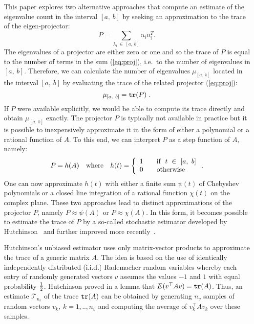 \documentclass[12pt]{article}		\usepackage{tabls,multirow}
\def\TT{\mathcal{T}}
\def\trace{\mbox{\tt tr}}
\newcommand{\ab}{[a, \ b]}
\def\nref#1{(\ref{#1})}
\newcommand{\eq}[1]{\begin{equation}\label{#1}}
\newcommand{\en}{\end{equation}}
\begin{document}
This paper explores two alternative approaches that compute an
estimate of the eigenvalue count in the interval $\ab$ by seeking an
approximation to the trace of the eigen-projector: \eq{eq:proj} P =
\sum_{\lambda_i \ \in \ \ab} u_i u_i^T .  \en The eigenvalues of a
projector are either zero or one and so the trace of $P$ is equal to
the number of terms in the sum \nref{eq:proj}, i.e.~to the number of
eigenvalues in $\ab$.  Therefore, we can calculate the number of
eigenvalues $\mu_{\ab}$ located in the interval $\ab$ by evaluating
the trace of the related projector \nref{eq:proj}:
\[
\mu_{\ab} = \trace (P ) \ .
\]
If $P$ were available explicitly, we would be able to compute its
trace directly and obtain $\mu_{\ab}$ exactly.  The projector $P$ is
typically not available in practice but it is possible to
inexpensively approximate it in the form of either a polynomial or a
rational function of $A$. To this end, we can interpret $P$ as a step
function of $A$, namely:
\begin{eqnarray}
\label{eq:hoft} 
P = h(A) \quad \mbox{where} \quad h(t) = \left\{\begin{array}{l l}
1  & \quad \textrm{if}\ \ t \ \in \ \ab\\
0  & \quad \textrm{otherwise}\\
\end{array}\right. .
\end{eqnarray}
One can now approximate $h(t)$ with either a finite sum $\psi(t)$ of
Chebyshev polynomials or a closed line integration of a rational
function $\chi(t)$ on the complex plane. These two approaches lead to
distinct approximations of the projector $P$, namely $P \approx
\psi(A)$ or $P \approx \chi(A)$.  In this form, it becomes possible to
estimate the trace of $P$ by a so-called stochastic estimator 
developed by Hutchinson~\cite{Hutchinson-est} and further improved
more recently~\cite{JTangYS, Iitaka:705693, Wong:2004tm}.

Hutchinson's unbiased estimator uses only matrix-vector products to
approximate the trace of a generic matrix $A$.  The idea is based on
the use of identically independently distributed (i.i.d.) Rademacher
random variables whereby each entry of randomly generated vectors $v$
assumes the values $-1$ and $1$ with equal probability ${1 \over 2}$.
Hutchinson proved in a lemma that $E(v^\top A v) = \trace (A)$.  Thus,
an estimate $\TT_{n_v}$ of the trace $\trace (A)$ can be obtained by
generating $n_v$ samples of random vectors $v_k,\ k=1,..,n_v$ and
computing the average of $v_k^\top A v_k $ over these samples.
\end{document}
